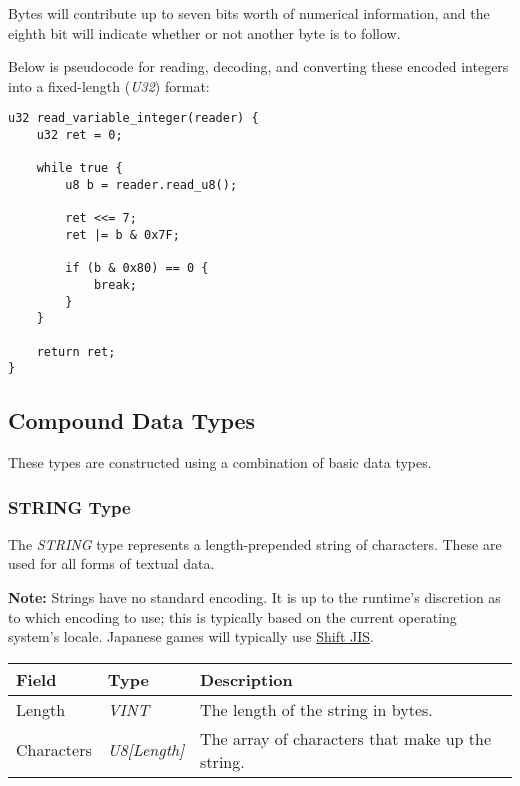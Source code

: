Bytes will contribute up to seven bits worth of numerical information, and the eighth bit will indicate whether or not another byte is to follow.

Below is pseudocode for reading, decoding, and converting these encoded integers into a fixed-length (\textit{U32}) format:

\begin{lstlisting}[frame=single]
u32 read_variable_integer(reader) {
    u32 ret = 0;

    while true {
        u8 b = reader.read_u8();

        ret <<= 7;
        ret |= b & 0x7F;

        if (b & 0x80) == 0 {
            break;
        }
    }

    return ret;
}
\end{lstlisting}

\subsection{Compound Data Types}
These types are constructed using a combination of basic data types.

\subsubsection{STRING Type}
The \textit{STRING} type represents a length-prepended string of characters. These are used for all forms of textual data.

\textbf{Note:} Strings have no standard encoding. It is up to the runtime's discretion as to which encoding to use; this is typically based on the current operating system's locale. Japanese games will typically use \href{https://en.wikipedia.org/wiki/Shift_JIS}{Shift JIS}.

\begin{table}[h!]
\centering
\begin{tabular}{|l|l|l|}
\hline
\textbf{Field} & \textbf{Type}           & \textbf{Description}                             \\ \hline
Length         & \textit{VINT}           & The length of the string in bytes.               \\ \hline
Characters     & \textit{U8{[}Length{]}} & The array of characters that make up the string. \\ \hline
\end{tabular}
\end{table}

